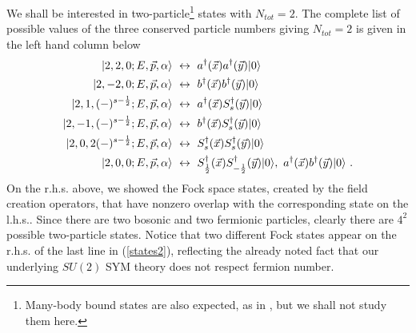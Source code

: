 \documentclass[11pt]{article}
\begin{document}
We shall be interested in two-particle\footnote{Many-body bound states are also expected, as in \cite{Hammer:2004as}, but we shall not study them here.} states with $N_{tot} = 2$. The complete list of possible values of the three conserved particle numbers giving $N_{tot}=2$ is given in the left hand column below
 \begin{align}
 \label{states2}
 |2,2,0; E, \vec{p}, \alpha \rangle  ~&\leftrightarrow ~a^\dagger(\vec x) a^\dagger(\vec y) |0\rangle  \nonumber \\
 |2,-2,0; E, \vec{p}, \alpha \rangle  ~&\leftrightarrow  ~b^\dagger(\vec x) b^\dagger(\vec y) |0\rangle \nonumber \\
  |2,1,(-)^{s-{1\over 2}}; E, \vec{p}, \alpha \rangle  ~&\leftrightarrow ~a^\dagger(\vec x) S_s^\dagger(\vec y) |0 \rangle \nonumber\\  |2,-1,(-)^{s-{1\over 2}}; E, \vec{p}, \alpha  \rangle ~&\leftrightarrow ~b^\dagger(\vec x) S_s^\dagger(\vec y) |0 \rangle\\
    |2,0,2(-)^{s-{1\over 2}}; E, \vec{p},  \alpha \rangle ~&\leftrightarrow ~S_s^\dagger(\vec x) S_s^\dagger(\vec y) |0 \rangle \nonumber \\
   |2,0,0; E, \vec{p}, \alpha \rangle ~&\leftrightarrow ~S_{1\over 2}^\dagger(\vec x) S_{-{1\over 2}}^\dagger(\vec y) |0 \rangle, ~a^\dagger(\vec x) b^\dagger(\vec y)  |0\rangle ~. \nonumber\end{align}  
On the r.h.s. above, we showed the Fock space states, created by the field creation operators, that have nonzero overlap with the corresponding state on the l.h.s.. Since there are two bosonic and two fermionic particles, clearly there are   $4^2$  possible two-particle states. 
Notice that two different Fock states appear on the r.h.s. of the last line in (\ref{states2}), reflecting the already noted fact that our underlying $SU(2)$ SYM theory does not respect fermion number.  
\end{document}

